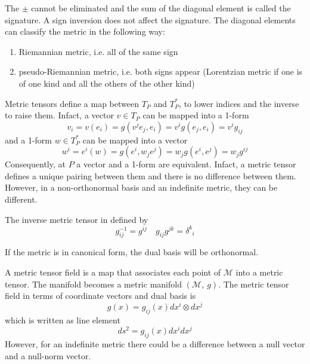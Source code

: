     The $\pm$ cannot be eliminated and the sum of the diagonal element is called the signature. A sign inversion does not affect the signature. The diagonal elements can classify the metric in the following way:
    \begin{enumerate}
        \item Riemannian metric, i.e. all of the same sign
        \item pseudo-Riemannian metric, i.e. both signs appear (Lorentzian metric if one is of one kind and all the others of the other kind)
    \end{enumerate}

    Metric tensors define a map between $T_P$ and $T^*_P$, to lower indices and the inverse to raise them. Infact, a vector $v \in T_P$ can be mapped into a 1-form
    \begin{equation*}
        v_i = v(e_i) = g(v^j e_j, e_i) = v^i g(e_j, e_i) = v^i g_{ij}
    \end{equation*}
    and a 1-form $w \in T^*_P$ can be mapped into a vector 
    \begin{equation*}
        w^i = e^i(w) = g(e^i, w_j e^j) = w_j g(e^i, e^j) = w_j g^{ij}
    \end{equation*}
    Consequently, at $P$ a vector and a 1-form are equivalent. Infact, a metric tensor defines a unique pairing between them and there is no difference between them. However, in a non-orthonormal basis and an indefinite metric, they can be different. 

    
    The inverse metric tensor in defined by 
    \begin{equation*}
        g^{-1}_{ij} = g^{ij} \quad g_{ij} g^{jk} = \delta^k_{\phantom k i}
    \end{equation*}

    If the metric is in canonical form, the dual basis will be orthonormal. 

    A metric tensor field is a map that associates each point of $\mathcal M$ into a metric tensor. The manifold becomes a metric manifold $(\mathcal M, ~g)$. The metric tensor field in terms of coordinate vectors and dual basis is 
    \begin{equation*}
        g(x) = g_{ij}(x) dx^i \otimes dx^j
    \end{equation*}
    which is written as line element
    \begin{equation*}
        ds^2 = g_{ij}(x) dx^i dx^j
    \end{equation*}
    However, for an indefinite metric there could be a difference between a null vector and a null-norm vector. 

